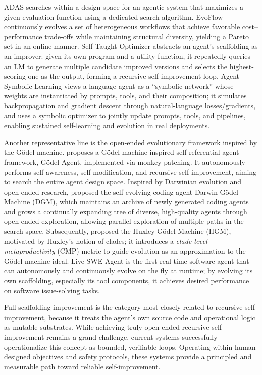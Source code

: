 ADAS \citep{hu2025automateddesignagenticsystems} searches within a design space for an agentic system that maximizes a given evaluation function using a dedicated search algorithm. EvoFlow continuously evolves a set of heterogeneous workflows that achieve favorable cost–performance trade-offs while maintaining structural diversity, yielding a Pareto set in an online manner. Self-Taught Optimizer \citep{zelikman2024self} abstracts an agent’s scaffolding as an improver: given its own program and a utility function, it repeatedly queries an LM to generate multiple candidate improved versions and selects the highest-scoring one as the output, forming a recursive self-improvement loop. Agent Symbolic Learning \citep{ou2025symbolic} views a language agent as a “symbolic network” whose weights are instantiated by prompts, tools, and their composition; it simulates backpropagation and gradient descent through natural-language losses/gradients, and uses a symbolic optimizer to jointly update prompts, tools, and pipelines, enabling sustained self-learning and evolution in real deployments.

Another representative line is the open-ended evolutionary framework inspired by the Gödel machine. \citet{yin2025godel} proposes a Gödel-machine-inspired self-referential agent framework, Gödel Agent, implemented via monkey patching. It autonomously performs self-awareness, self-modification, and recursive self-improvement, aiming to search the entire agent design space. Inspired by Darwinian evolution and open-ended research, \cite{zhang2025darwingodelmachineopenended} proposed the self-evolving coding agent Darwin Gödel Machine (DGM), which maintains an archive of newly generated coding agents and grows a continually expanding tree of diverse, high-quality agents through open-ended exploration, allowing parallel exploration of multiple paths in the search space. Subsequently, \cite{wang2025huxleygodelmachinehumanlevelcoding} proposed the Huxley-Gödel Machine (HGM), motivated by Huxley’s notion of clades; it introduces a \textit{clade-level metaproductivity} (CMP) metric to guide evolution as an approximation to the Gödel-machine ideal. Live-SWE-Agent \citep{xia2025livesweagentsoftwareengineeringagents} is the first real-time software agent that can autonomously and continuously evolve on the fly at runtime; by evolving its own scaffolding, especially its tool components, it achieves desired performance on software issue-solving tasks.

\begin{ttcolorbox}[Takeaway]
Full scaffolding improvement is the category most closely related to recursive self-improvement, because it treats the agent's own source code and operational logic as mutable substrates. While achieving truly open-ended recursive self-improvement remains a grand challenge, current systems successfully operationalize this concept as bounded, verifiable loops. Operating within human-designed objectives and safety protocols, these systems provide a principled and measurable path toward reliable self-improvement.
\end{ttcolorbox}
